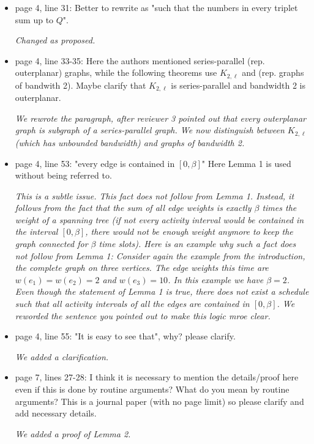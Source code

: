 \documentclass[11pt,a4paper]{article}
\begin{document}
\begin{itemize}
\item page 4, line 31: Better to rewrite as "such that the numbers in every triplet sum up to $Q$".

\textit{Changed as proposed.}

\item page 4, line 33-35: Here the authors mentioned series-parallel (rep. outerplanar) graphs, while the following theorems use $K_{2,\ell}$ and (rep. graphs of bandwith 2). Maybe clarify that $K_{2,\ell}$ is series-parallel and bandwidth 2 is outerplanar.

\textit{We rewrote the paragraph, after reviewer 3 pointed out that every outerplanar graph is subgraph of a series-parallel graph. We now distinguish between $K_{2,\ell}$ (which has unbounded bandwidth) and graphs of bandwidth 2.}

\item page 4, line 53: "every edge is contained in $[0, \beta]$" Here Lemma 1 is used without being referred to.

\textit{This is a subtle issue. This fact does not follow from Lemma 1. Instead, it follows from the fact that the sum of all edge weights is exactly $\beta$ times the weight of a spanning tree (if not every activity interval would be contained in the interval $[0, \beta]$, there would not be enough weight anymore to keep the graph connected for $\beta$ time slots). Here is an example why such a fact does not follow from Lemma 1: Consider again the example from the introduction, the complete graph on three vertices. The edge weights this time are $w(e_1) = w(e_2) = 2$ and $w(e_3) = 10$. In this example we have $\beta = 2$. Even though the statement of Lemma 1 is true, there does not exist a schedule such that all activity intervals of all the edges are contained in $[0, \beta]$. We reworded the sentence you pointed out to make this logic mroe clear.}

\item page 4, line 55: "It is easy to see that", why? please clarify.

\textit{We added a clarification.}

\item page 7, lines 27-28: I think it is necessary to mention the details/proof here even if this is done by routine arguments? What do you mean by routine arguments? This is a journal paper (with no page limit) so please clarify and add necessary details.

\textit{We added a proof of Lemma 2.}


\end{itemize}
\end{document}
